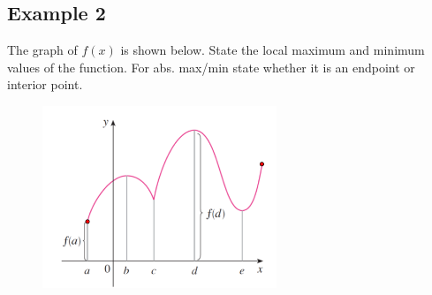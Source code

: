 \documentclass[10pt]{book}
\theoremstyle{definition}
\begin{document}
\subsection*{Example 2} The graph of $f(x)$ is shown below. State the local maximum and minimum values of the function. For abs. max/min state whether it is an endpoint or interior point.
\begin{figure}[h]
    \includegraphics[width=7cm]{Graph_1.png}
\end{figure}
\end{document}

